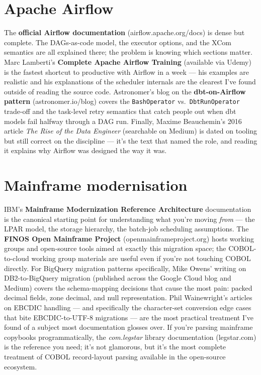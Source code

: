 \documentclass[
  11pt,
  british,
  oneside]{book}
\begin{document}
\hypertarget{apache-airflow}{%
\section{Apache Airflow}\label{apache-airflow}}

The \textbf{official Airflow documentation} (airflow.apache.org/docs) is
dense but complete. The DAGs-as-code model, the executor options, and
the XCom semantics are all explained there; the problem is knowing which
sections matter. Marc Lamberti's \textbf{Complete Apache Airflow
Training} (available via Udemy) is the fastest shortcut to productive
with Airflow in a week --- his examples are realistic and his
explanations of the scheduler internals are the clearest I've found
outside of reading the source code. Astronomer's blog on the
\textbf{dbt-on-Airflow pattern} (astronomer.io/blog) covers the
\texttt{BashOperator} vs.~\texttt{DbtRunOperator} trade-off and the
task-level retry semantics that catch people out when dbt models fail
halfway through a DAG run. Finally, Maxime Beauchemin's 2016 article
\emph{The Rise of the Data Engineer} (searchable on Medium) is dated on
tooling but still correct on the discipline --- it's the text that named
the role, and reading it explains why Airflow was designed the way it
was.

\hypertarget{mainframe-modernisation}{%
\section{Mainframe modernisation}\label{mainframe-modernisation}}

IBM's \textbf{Mainframe Modernization Reference Architecture}
documentation is the canonical starting point for understanding what
you're moving \emph{from} --- the LPAR model, the storage hierarchy, the
batch-job scheduling assumptions. The \textbf{FINOS Open Mainframe
Project} (openmainframeproject.org) hosts working groups and open-source
tools aimed at exactly this migration space; the COBOL-to-cloud working
group materials are useful even if you're not touching COBOL directly.
For BigQuery migration patterns specifically, Mike Owens' writing on
DB2-to-BigQuery migration (published across the Google Cloud blog and
Medium) covers the schema-mapping decisions that cause the most pain:
packed decimal fields, zone decimal, and null representation. Phil
Wainewright's articles on EBCDIC handling --- and specifically the
character-set conversion edge cases that bite EBCDIC-to-UTF-8 migrations
--- are the most practical treatment I've found of a subject most
documentation glosses over. If you're parsing mainframe copybooks
programmatically, the \emph{com.legstar} library documentation
(legstar.com) is the reference you need; it's not glamorous, but it's
the most complete treatment of COBOL record-layout parsing available in
the open-source ecosystem.
\end{document}
